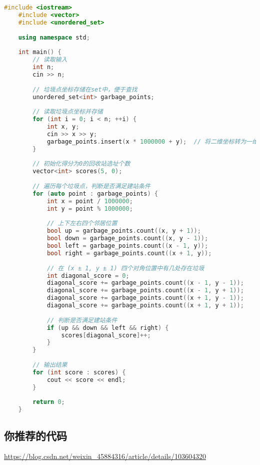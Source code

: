 \begin{lstlisting}[language=C++]
    #include <iostream>
    #include <vector>
    #include <unordered_set>
    
    using namespace std;
    
    int main() {
        // 读取输入
        int n;
        cin >> n;
    
        // 垃圾点坐标存储在set中，便于查找
        unordered_set<int> garbage_points;
        
        // 读取垃圾点坐标并存储
        for (int i = 0; i < n; ++i) {
            int x, y;
            cin >> x >> y;
            garbage_points.insert(x * 1000000 + y);  // 将二维坐标转为一维，确保唯一性
        }
    
        // 初始化得分为0的回收站选址个数
        vector<int> scores(5, 0);
    
        // 遍历每个垃圾点，判断是否满足建站条件
        for (auto point : garbage_points) {
            int x = point / 1000000;
            int y = point % 1000000;
    
            // 上下左右四个邻居位置
            bool up = garbage_points.count((x, y + 1));
            bool down = garbage_points.count((x, y - 1));
            bool left = garbage_points.count((x - 1, y));
            bool right = garbage_points.count((x + 1, y));
    
            // 在 (x ± 1, y ± 1) 四个对角位置中有几处存在垃圾
            int diagonal_score = 0;
            diagonal_score += garbage_points.count((x - 1, y - 1));
            diagonal_score += garbage_points.count((x - 1, y + 1));
            diagonal_score += garbage_points.count((x + 1, y - 1));
            diagonal_score += garbage_points.count((x + 1, y + 1));
    
            // 判断是否满足建站条件
            if (up && down && left && right) {
                scores[diagonal_score]++;
            }
        }
    
        // 输出结果
        for (int score : scores) {
            cout << score << endl;
        }
    
        return 0;
    }    
\end{lstlisting}

\subsection{你推荐的代码}

\href{201912-2 回收站选址}{https://blog.csdn.net/weixin\_45884316/article/details/103604320}

